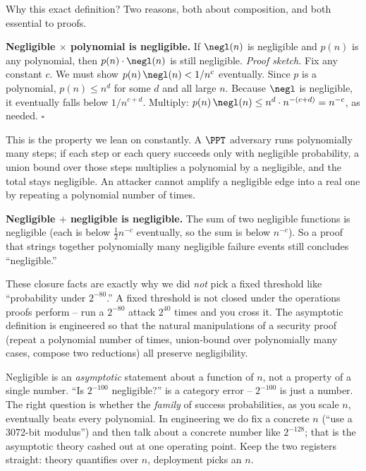 Why this exact definition? Two reasons, both about composition, and both essential to proofs.

\begin{whybox}
\textbf{Negligible $\times$ polynomial is negligible.} If $\negl(n)$ is negligible and $p(n)$ is any polynomial, then $p(n)\cdot\negl(n)$ is still negligible. \emph{Proof sketch.} Fix any constant $c$. We must show $p(n)\,\negl(n) < 1/n^{c}$ eventually. Since $p$ is a polynomial, $p(n) \le n^{d}$ for some $d$ and all large $n$. Because $\negl$ is negligible, it eventually falls below $1/n^{c+d}$. Multiply: $p(n)\,\negl(n) \le n^{d}\cdot n^{-(c+d)} = n^{-c}$, as needed. $\square$

This is the property we lean on constantly. A $\PPT$ adversary runs polynomially many steps; if each step or each query succeeds only with negligible probability, a union bound over those steps multiplies a polynomial by a negligible, and the total stays negligible. An attacker cannot amplify a negligible edge into a real one by repeating a polynomial number of times.

\textbf{Negligible $+$ negligible is negligible.} The sum of two negligible functions is negligible (each is below $\tfrac12 n^{-c}$ eventually, so the sum is below $n^{-c}$). So a proof that strings together polynomially many negligible failure events still concludes ``negligible.''
\end{whybox}

These closure facts are exactly why we did \emph{not} pick a fixed threshold like ``probability under $2^{-80}$.'' A fixed threshold is not closed under the operations proofs perform -- run a $2^{-80}$ attack $2^{40}$ times and you cross it. The asymptotic definition is engineered so that the natural manipulations of a security proof (repeat a polynomial number of times, union-bound over polynomially many cases, compose two reductions) all preserve negligibility.

\begin{trapbox}
Negligible is an \emph{asymptotic} statement about a function of $n$, not a property of a single number. ``Is $2^{-100}$ negligible?'' is a category error -- $2^{-100}$ is just a number. The right question is whether the \emph{family} of success probabilities, as you scale $n$, eventually beats every polynomial. In engineering we do fix a concrete $n$ (``use a 3072-bit modulus'') and then talk about a concrete number like $2^{-128}$; that is the asymptotic theory cashed out at one operating point. Keep the two registers straight: theory quantifies over $n$, deployment picks an $n$.
\end{trapbox}


